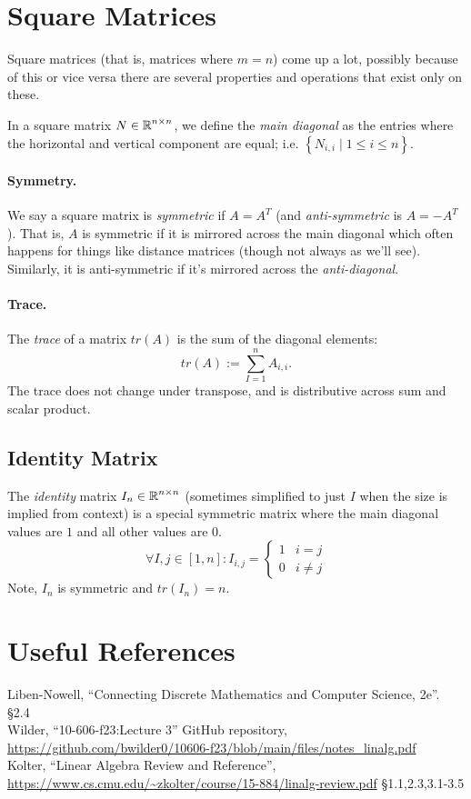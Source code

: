 \section{Square Matrices}
Square matrices (that is, matrices where $m=n$) come up a lot, 
possibly because of this or vice versa there are several properties and operations that exist only on these. 

In a square matrix $N\in\operatorname{\mathbb{R}}^{n\times n}$, we define the \emph{main diagonal} as the entries where the horizontal and vertical component are equal; 
i.e. $\left\{N_{i,i} \mid 1 \le i \le n\right\}$. 

\paragraph{Symmetry.}
We say a square matrix is \emph{symmetric} if $A=A^T$
(and \textit{anti-symmetric} is $A = -A^T$). 
That is, $A$ is symmetric if it is mirrored across the main diagonal which often happens for things like distance matrices (though not always as we'll see). 
Similarly, it is anti-symmetric if it's mirrored across the \textit{anti-diagonal}.

\paragraph{Trace. }
The \emph{trace} of a matrix $tr(A)$ is the sum of the diagonal elements: \[tr(A) := \sum_{I=1}^n A_{i,i}.\] 
The trace does not change under transpose, and is distributive across sum and scalar product. 

\subsection{Identity Matrix}

The \emph{identity} matrix $I_n \in\operatorname{\mathbb{R}}^{n\times n}$ (sometimes simplified to just $I$ when the size is implied from context) 
is a special symmetric matrix where the main diagonal values are $1$ and all other values are $0$.
\[
\forall I,j \in [1,n]: I_{i,j} = \begin{cases} 1 & i=j\\ 0 & i\ne j\end{cases}
\]
Note, $I_n$ is symmetric and $tr(I_n)=n$.


\section*{Useful References}
Liben-Nowell, ``Connecting Discrete Mathematics and Computer Science, 2e''. \S 2.4\\
Wilder, ``10-606-f23:Lecture 3'' GitHub repository, \url{https://github.com/bwilder0/10606-f23/blob/main/files/notes_linalg.pdf}\\
Kolter, ``Linear Algebra Review and Reference'', \url{https://www.cs.cmu.edu/~zkolter/course/15-884/linalg-review.pdf} \S1.1,2.3,3.1-3.5

